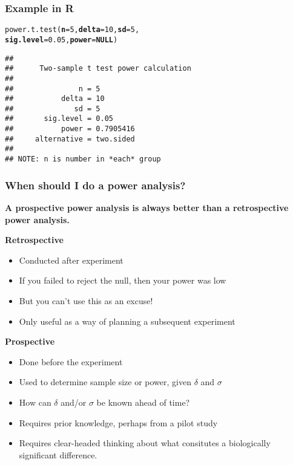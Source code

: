 \documentclass[color=usenames,dvipsnames]{beamer}\usepackage[]{graphicx}\usepackage[]{color}
\makeatletter
\newcommand{\hlnum}[1]{\textcolor[rgb]{0.69,0.494,0}{#1}}%
\newcommand{\hlstd}[1]{\textcolor[rgb]{0,0,0}{#1}}%
\newcommand{\hlkwa}[1]{\textcolor[rgb]{0,0,0}{\textbf{#1}}}%
\newcommand{\hlkwc}[1]{\textcolor[rgb]{0,0,0}{\textbf{#1}}}%
\newcommand{\hlkwd}[1]{\textcolor[rgb]{0.004,0.004,0.506}{#1}}%
\newenvironment{kframe}{%
 \def\at@end@of@kframe{}%
 \ifinner\ifhmode%
  \def\at@end@of@kframe{\end{minipage}}%
  \begin{minipage}{\columnwidth}%
 \fi\fi%
 \def\FrameCommand##1{\hskip\@totalleftmargin \hskip-\fboxsep
 \colorbox{shadecolor}{##1}\hskip-\fboxsep
     \hskip-\linewidth \hskip-\@totalleftmargin \hskip\columnwidth}%
 \MakeFramed {\advance\hsize-\width
   \@totalleftmargin\z@ \linewidth\hsize
   \@setminipage}}%
 {\par\unskip\endMakeFramed%
 \at@end@of@kframe}
\newenvironment{knitrout}{}{} %
\makeatother
\begin{document}
\begin{frame}[fragile]
  \frametitle{Example in {\bf R}}
  \small
\begin{knitrout}
\color{fgcolor}\begin{kframe}
\begin{alltt}
\hlkwd{power.t.test}\hlstd{(}\hlkwc{n}\hlstd{=}\hlnum{5}\hlstd{,} \hlkwc{delta}\hlstd{=}\hlnum{10}\hlstd{,} \hlkwc{sd}\hlstd{=}\hlnum{5}\hlstd{,}
             \hlkwc{sig.level}\hlstd{=}\hlnum{0.05}\hlstd{,} \hlkwc{power}\hlstd{=}\hlkwa{NULL}\hlstd{)}
\end{alltt}
\begin{verbatim}
## 
##      Two-sample t test power calculation 
## 
##               n = 5
##           delta = 10
##              sd = 5
##       sig.level = 0.05
##           power = 0.7905416
##     alternative = two.sided
## 
## NOTE: n is number in *each* group
\end{verbatim}
\end{kframe}
\end{knitrout}
\end{frame}









\begin{frame}
  \frametitle{When should I do a power analysis?}
  {\bf A prospective power analysis is always better than a
    retrospective power analysis.} \par
  \pause
  \vfill
  {\bf Retrospective}
  \begin{itemize}
    \item Conducted after experiment
    \item If you failed to reject the null, then your power was low
    \item But you can't use this as an excuse!
    \item Only useful as a way of planning a subsequent experiment
  \end{itemize}
  \pause
  \vfill
  {\bf Prospective}
  \begin{itemize}
    \item Done before the experiment
    \item Used to determine sample size or power, given $\delta$ and $\sigma$
    \item How can $\delta$ and/or $\sigma$ be known ahead of time?
    \item Requires prior knowledge, perhaps from a pilot study
    \item Requires clear-headed thinking about what consitutes a
      biologically significant difference.
  \end{itemize}
\end{frame}
\end{document}
